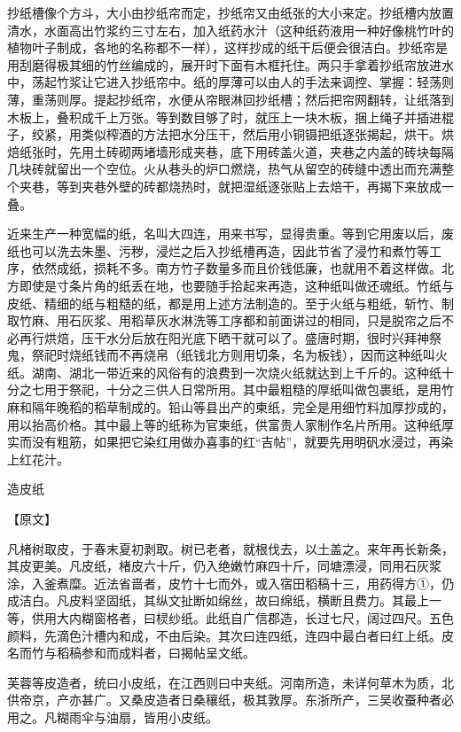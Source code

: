 \documentclass[12pt,UTF8]{ctexbook}
\begin{document}
抄纸槽像个方斗，大小由抄纸帘而定，抄纸帘又由纸张的大小来定。抄纸槽内放置清水，水面高出竹浆约三寸左右，加入纸药水汁（这种纸药液用一种好像桃竹叶的植物叶子制成，各地的名称都不一样），这样抄成的纸干后便会很洁白。抄纸帘是用刮磨得极其细的竹丝编成的，展开时下面有木框托住。两只手拿着抄纸帘放进水中，荡起竹浆让它进入抄纸帘中。纸的厚薄可以由人的手法来调控、掌握：轻荡则薄，重荡则厚。提起抄纸帘，水便从帘眼淋回抄纸槽；然后把帘网翻转，让纸落到木板上，叠积成千上万张。等到数目够了时，就压上一块木板，捆上绳子并插进棍子，绞紧，用类似榨酒的方法把水分压干，然后用小铜镊把纸逐张揭起，烘干。烘焙纸张时，先用土砖砌两堵墙形成夹巷，底下用砖盖火道，夹巷之内盖的砖块每隔几块砖就留出一个空位。火从巷头的炉口燃烧，热气从留空的砖缝中透出而充满整个夹巷，等到夹巷外壁的砖都烧热时，就把湿纸逐张贴上去焙干，再揭下来放成一叠。

近来生产一种宽幅的纸，名叫大四连，用来书写，显得贵重。等到它用废以后，废纸也可以洗去朱墨、污秽，浸烂之后入抄纸槽再造，因此节省了浸竹和煮竹等工序，依然成纸，损耗不多。南方竹子数量多而且价钱低廉，也就用不着这样做。北方即使是寸条片角的纸丢在地，也要随手拾起来再造，这种纸叫做还魂纸。竹纸与皮纸、精细的纸与粗糙的纸，都是用上述方法制造的。至于火纸与粗纸，斩竹、制取竹麻、用石灰浆、用稻草灰水淋洗等工序都和前面讲过的相同，只是脱帘之后不必再行烘焙，压干水分后放在阳光底下晒干就可以了。盛唐时期，很时兴拜神祭鬼，祭祀时烧纸钱而不再烧帛（纸钱北方则用切条，名为板钱），因而这种纸叫火纸。湖南、湖北一带近来的风俗有的浪费到一次烧火纸就达到上千斤的。这种纸十分之七用于祭祀，十分之三供人日常所用。其中最粗糙的厚纸叫做包裹纸，是用竹麻和隔年晚稻的稻草制成的。铅山等县出产的柬纸，完全是用细竹料加厚抄成的，用以抬高价格。其中最上等的纸称为官柬纸，供富贵人家制作名片所用。这种纸厚实而没有粗筋，如果把它染红用做办喜事的红“吉帖”，就要先用明矾水浸过，再染上红花汁。

造皮纸

【原文】

凡楮树取皮，于春末夏初剥取。树已老者，就根伐去，以土盖之。来年再长新条，其皮更美。凡皮纸，楮皮六十斤，仍入绝嫩竹麻四十斤，同塘漂浸，同用石灰浆涂，入釜煮糜。近法省啬者，皮竹十七而外，或入宿田稻稿十三，用药得方①，仍成洁白。凡皮料坚固纸，其纵文扯断如绵丝，故曰绵纸，横断且费力。其最上一等，供用大内糊窗格者，曰棂纱纸。此纸自广信郡造，长过七尺，阔过四尺。五色颜料，先滴色汁槽内和成，不由后染。其次曰连四纸，连四中最白者曰红上纸。皮名而竹与稻稿参和而成料者，曰揭帖呈文纸。

芙蓉等皮造者，统曰小皮纸，在江西则曰中夹纸。河南所造，未详何草木为质，北供帝京，产亦甚广。又桑皮造者日桑穰纸，极其敦厚。东浙所产，三吴收蚕种者必用之。凡糊雨伞与油扇，皆用小皮纸。
\end{document}
